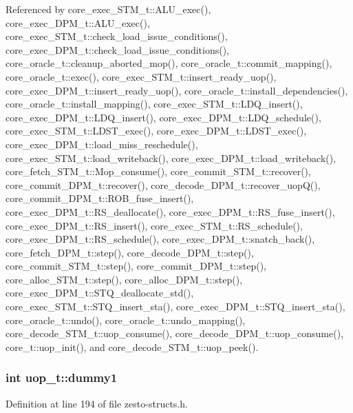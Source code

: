 Referenced by core\_\-exec\_\-STM\_\-t::ALU\_\-exec(), core\_\-exec\_\-DPM\_\-t::ALU\_\-exec(), core\_\-exec\_\-STM\_\-t::check\_\-load\_\-issue\_\-conditions(), core\_\-exec\_\-DPM\_\-t::check\_\-load\_\-issue\_\-conditions(), core\_\-oracle\_\-t::cleanup\_\-aborted\_\-mop(), core\_\-oracle\_\-t::commit\_\-mapping(), core\_\-oracle\_\-t::exec(), core\_\-exec\_\-STM\_\-t::insert\_\-ready\_\-uop(), core\_\-exec\_\-DPM\_\-t::insert\_\-ready\_\-uop(), core\_\-oracle\_\-t::install\_\-dependencies(), core\_\-oracle\_\-t::install\_\-mapping(), core\_\-exec\_\-STM\_\-t::LDQ\_\-insert(), core\_\-exec\_\-DPM\_\-t::LDQ\_\-insert(), core\_\-exec\_\-DPM\_\-t::LDQ\_\-schedule(), core\_\-exec\_\-STM\_\-t::LDST\_\-exec(), core\_\-exec\_\-DPM\_\-t::LDST\_\-exec(), core\_\-exec\_\-DPM\_\-t::load\_\-miss\_\-reschedule(), core\_\-exec\_\-STM\_\-t::load\_\-writeback(), core\_\-exec\_\-DPM\_\-t::load\_\-writeback(), core\_\-fetch\_\-STM\_\-t::Mop\_\-consume(), core\_\-commit\_\-STM\_\-t::recover(), core\_\-commit\_\-DPM\_\-t::recover(), core\_\-decode\_\-DPM\_\-t::recover\_\-uopQ(), core\_\-commit\_\-DPM\_\-t::ROB\_\-fuse\_\-insert(), core\_\-exec\_\-DPM\_\-t::RS\_\-deallocate(), core\_\-exec\_\-DPM\_\-t::RS\_\-fuse\_\-insert(), core\_\-exec\_\-DPM\_\-t::RS\_\-insert(), core\_\-exec\_\-STM\_\-t::RS\_\-schedule(), core\_\-exec\_\-DPM\_\-t::RS\_\-schedule(), core\_\-exec\_\-DPM\_\-t::snatch\_\-back(), core\_\-fetch\_\-DPM\_\-t::step(), core\_\-decode\_\-DPM\_\-t::step(), core\_\-commit\_\-STM\_\-t::step(), core\_\-commit\_\-DPM\_\-t::step(), core\_\-alloc\_\-STM\_\-t::step(), core\_\-alloc\_\-DPM\_\-t::step(), core\_\-exec\_\-DPM\_\-t::STQ\_\-deallocate\_\-std(), core\_\-exec\_\-STM\_\-t::STQ\_\-insert\_\-sta(), core\_\-exec\_\-DPM\_\-t::STQ\_\-insert\_\-sta(), core\_\-oracle\_\-t::undo(), core\_\-oracle\_\-t::undo\_\-mapping(), core\_\-decode\_\-STM\_\-t::uop\_\-consume(), core\_\-decode\_\-DPM\_\-t::uop\_\-consume(), core\_\-t::uop\_\-init(), and core\_\-decode\_\-STM\_\-t::uop\_\-peek().
\subsubsection[{dummy1}]{\setlength{\rightskip}{0pt plus 5cm}int {\bf uop\_\-t::dummy1}}\label{structuop__t_0f60fa344231786ae4506e4c0c8c8a31}




Definition at line 194 of file zesto-structs.h.
